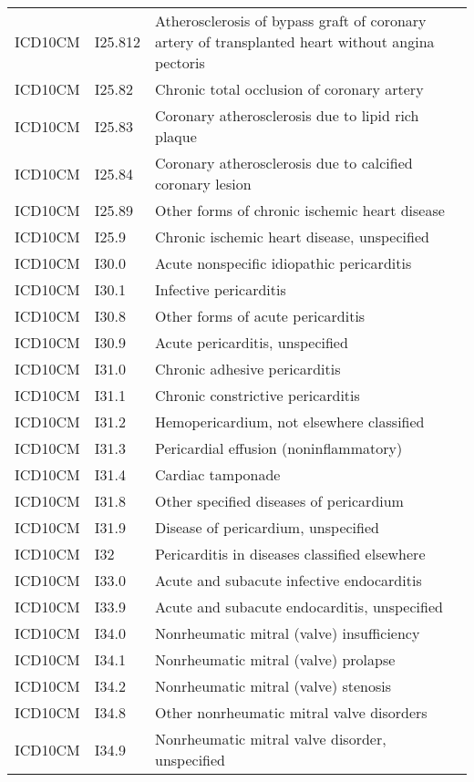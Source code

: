 \begin{longtable}{p{}p{}p{}}
  ICD10CM & I25.812 & Atherosclerosis of bypass graft of coronary artery of transplanted heart without angina pectoris \\ 
  ICD10CM & I25.82 & Chronic total occlusion of coronary artery \\ 
  ICD10CM & I25.83 & Coronary atherosclerosis due to lipid rich plaque \\ 
  ICD10CM & I25.84 & Coronary atherosclerosis due to calcified coronary lesion \\ 
  ICD10CM & I25.89 & Other forms of chronic ischemic heart disease \\ 
  ICD10CM & I25.9 & Chronic ischemic heart disease, unspecified \\ 
  ICD10CM & I30.0 & Acute nonspecific idiopathic pericarditis \\ 
  ICD10CM & I30.1 & Infective pericarditis \\ 
  ICD10CM & I30.8 & Other forms of acute pericarditis \\ 
  ICD10CM & I30.9 & Acute pericarditis, unspecified \\ 
  ICD10CM & I31.0 & Chronic adhesive pericarditis \\ 
  ICD10CM & I31.1 & Chronic constrictive pericarditis \\ 
  ICD10CM & I31.2 & Hemopericardium, not elsewhere classified \\ 
  ICD10CM & I31.3 & Pericardial effusion (noninflammatory) \\ 
  ICD10CM & I31.4 & Cardiac tamponade \\ 
  ICD10CM & I31.8 & Other specified diseases of pericardium \\ 
  ICD10CM & I31.9 & Disease of pericardium, unspecified \\ 
  ICD10CM & I32 & Pericarditis in diseases classified elsewhere \\ 
  ICD10CM & I33.0 & Acute and subacute infective endocarditis \\ 
  ICD10CM & I33.9 & Acute and subacute endocarditis, unspecified \\ 
  ICD10CM & I34.0 & Nonrheumatic mitral (valve) insufficiency \\ 
  ICD10CM & I34.1 & Nonrheumatic mitral (valve) prolapse \\ 
  ICD10CM & I34.2 & Nonrheumatic mitral (valve) stenosis \\ 
  ICD10CM & I34.8 & Other nonrheumatic mitral valve disorders \\ 
  ICD10CM & I34.9 & Nonrheumatic mitral valve disorder, unspecified \\ 

\end{longtable}
